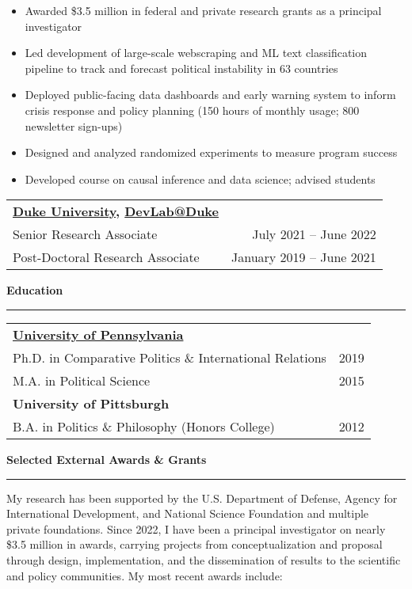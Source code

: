 \documentclass[11pt]{article}
\begin{document}
\begin{itemize}[itemsep=0mm, parsep=0pt]
\item Awarded \$3.5 million in federal and private research grants as a principal investigator 
\item Led development of large-scale webscraping and ML text classification pipeline to track and forecast political instability in 63 countries
\item Deployed public-facing data dashboards and early warning system to inform crisis response and policy planning (150 hours of monthly usage; 800 newsletter sign-ups)
\item Designed and analyzed randomized experiments to measure program success
\item Developed course on causal inference and data science; advised students
\end{itemize}

\noindent\begin{tabular*}{\textwidth}{@{}l@{\extracolsep{\fill}}r@{}}
\textbf{\href{https://polisci.duke.edu/}{Duke University}, \href{https://www.devlabduke.com/}{DevLab@Duke}}\\
Senior Research Associate & July 2021 -- June 2022\\
Post-Doctoral Research Associate & January 2019 -- June 2021\\
\end{tabular*}


\textbf{\large Education}\\
\rule[3mm]{\textwidth}{.2pt}
\noindent\begin{tabular*}{\textwidth}{@{}l@{\extracolsep{\fill}}r@{}}
\textbf{\href{https://www.sas.upenn.edu/polisci/}{University of Pennsylvania}}\\
Ph.D. in Comparative Politics \& International Relations & 2019\\
M.A. in Political Science & 2015\\
\textbf{University of Pittsburgh}\\
B.A. in Politics \& Philosophy (Honors College) & 2012
\end{tabular*}

\textbf{\large Selected External Awards \& Grants}\\
\rule[3mm]{\textwidth}{.2pt}
My research has been supported by the U.S. Department of Defense, Agency for International Development, and National Science Foundation and multiple private foundations. Since 2022, I have been a principal investigator on nearly \$3.5 million in awards, carrying projects from conceptualization and proposal through design, implementation, and the dissemination of results to the scientific and policy communities. My most recent awards include:
\end{document}

